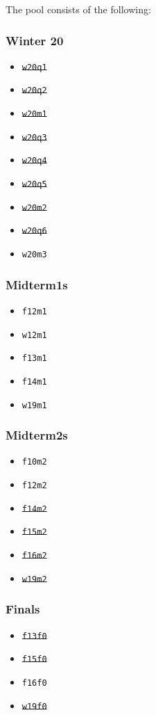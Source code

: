 The pool consists of the following:

\def\width{0.24}
\begin{minipage}[t]{\width\textwidth}
    \subsubsection*{Winter 20}
    \begin{itemize}
        \item \st{\texttt{w20q1}}
        \item \st{\texttt{w20q2}}
        \item \st{\texttt{w20m1}}
        \item \st{\texttt{w20q3}}
        \item \st{\texttt{w20q4}}
        \item \st{\texttt{w20q5}}
        \item \st{\texttt{w20m2}}
        \item \st{\texttt{w20q6}}
        \item \texttt{w20m3}
    \end{itemize}
\end{minipage}
\begin{minipage}[t]{\width\textwidth}
    \subsubsection*{Midterm1s}
    \begin{itemize}
        \item \texttt{f12m1}
        \item \texttt{w12m1}
        \item \texttt{f13m1}
        \item \texttt{f14m1}
        \item \texttt{w19m1}
    \end{itemize}    
\end{minipage}
\begin{minipage}[t]{\width\textwidth}
    \subsubsection*{Midterm2s}
    \begin{itemize}
        \item \texttt{f10m2}
        \item \texttt{f12m2}
        \item \st{\texttt{f14m2}}
        \item \st{\texttt{f15m2}}
        \item \st{\texttt{f16m2}}
        \item \st{\texttt{w19m2}}
    \end{itemize}    
\end{minipage}
\begin{minipage}[t]{\width\textwidth}
    \subsubsection*{Finals}
    \begin{itemize}
        \item \st{\texttt{f13f0}}
        \item \st{\texttt{f15f0}}
        \item \texttt{f16f0}
        \item \st{\texttt{w19f0}}
    \end{itemize}
\end{minipage}